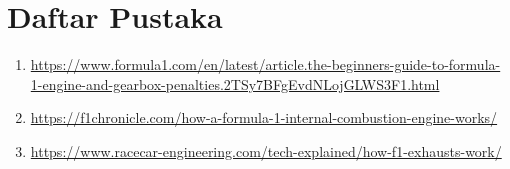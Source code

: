 \section{Daftar Pustaka}

\begin{enumerate}
    \item \footnotesize\url{https://www.formula1.com/en/latest/article.the-beginners-guide-to-formula-1-engine-and-gearbox-penalties.2TSy7BFgEvdNLojGLWS3F1.html}
    \item \footnotesize\url{https://f1chronicle.com/how-a-formula-1-internal-combustion-engine-works/}
    \item \footnotesize\url{https://www.racecar-engineering.com/tech-explained/how-f1-exhausts-work/}
\end{enumerate}